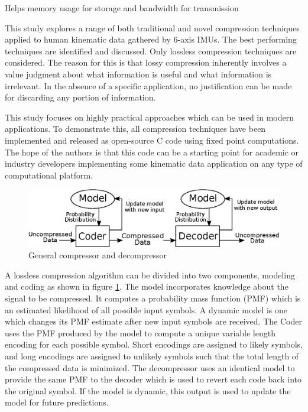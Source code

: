 \documentclass[journal]{IEEEtran}
\begin{document}
Helps memory usage for storage and bandwidth for transmission

This study explores a range of both traditional and novel compression techniques applied to human kinematic data gathered by 6-axis IMUs. The best performing techniques are identified and discussed. Only lossless compression techniques are considered. The reason for this is that lossy compression inherently involves a value judgment about what information is useful and what information is irrelevant. In the absence of a specific application, no justification can be made for discarding any portion of information.

This study focuses on highly practical approaches which can be used in modern applications. To demonstrate this, all compression techniques have been implemented and released as open-source C code using fixed point computations. The hope of the authors is that this code can be a starting point for academic or industry developers implementing some kinematic data application on any type of computational platform.

\begin{figure}
  \includegraphics[width=\linewidth]{general_compressor.eps}
  \caption{General compressor and decompressor}
  \label{fig:general_compressor}
\end{figure}

A lossless compression algorithm can be divided into two components, modeling and coding as shown in figure \ref{fig:general_compressor}. The model incorporates knowledge about the signal to be compressed. It computes a probability mass function (PMF) which is an estimated likelihood of all possible input symbols. A dynamic model is one which changes its PMF estimate after new input symbols are received. The Coder uses the PMF produced by the model to compute a unique variable length encoding for each possible symbol. Short encodings are assigned to likely symbols, and long encodings are assigned to unlikely symbols such that the total length of the compressed data is minimized. The decompressor uses an identical model to provide the same PMF to the decoder which is used to revert each code back into the original symbol. If the model is dynamic, this output is used to update the model for future predictions.
\end{document}
